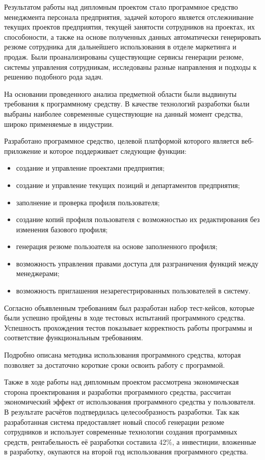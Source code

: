 
Результатом работы над дипломным проектом стало программное средство менеджмента персонала предприятия, задачей
которого является отслежнивание текущих проектов предприятия, текущей занятости сотрудников на проектах, их способоности,
а также на основе полученных данных автоматически генерировать резюме сотрудника для дальнейшего использования в
отделе маркетинга и продаж. Были проанализированы существующие сервисы генерации резюме, системы управления сотрудникам,
исследованы разные направления и подходы к решению подобного рода задач.

На основании проведенного анализа предметной области были выдвинуты требования к программному средству. В качестве
технологий разработки были выбраны наиболее современные существующие на данный момент средства, широко применяемые в
индустрии.

Разработано программное средство, целевой платформой которого является веб-приложение и которое поддерживает следующие
функции:

\begin{itemize}
	\item создание и управление проектами предприятия;
	\item создание и управление текущих позиций и департаментов предприятия;
	\item заполнение и проверка профиля пользователя;
	\item создание копий профиля пользователя с возможностью их редактирования без изменения базового профиля;
	\item генерация резюме пользоателя на основе заполненного профиля;
	\item возможность управления правами доступа для разграничения функций между менеджерами;
	\item возможность приглашения незарегестрированных пользователей в систему.
\end{itemize}

Согласно объявленным требованиям был разработан набор тест-кейсов, которые были успешно пройдены в ходе тестовых
испытаний программного средства. Успешность прохождения тестов показывает корректность работы программы и соответствие
функциональным требованиям.

Подробно описана методика использования программного средства, которая позволяет за достаточно короткие сроки освоить
работу с программой.

Также в ходе работы над дипломным проектом рассмотрена экономическая сторона проектирования и разработки программного
средства, рассчитан экономический эффект от использования программного средства у пользователя. В результате расчётов
подтвердилась целесообразность разработки. Так как разработанная система предоставляет новый способ генерации резюме
сотрудников и использует современные технологии создания программных средств, рентабельность её разработки
составила 42\%, а инвестиции, вложенные в разработку, окупаются на второй год использования программного средства.

